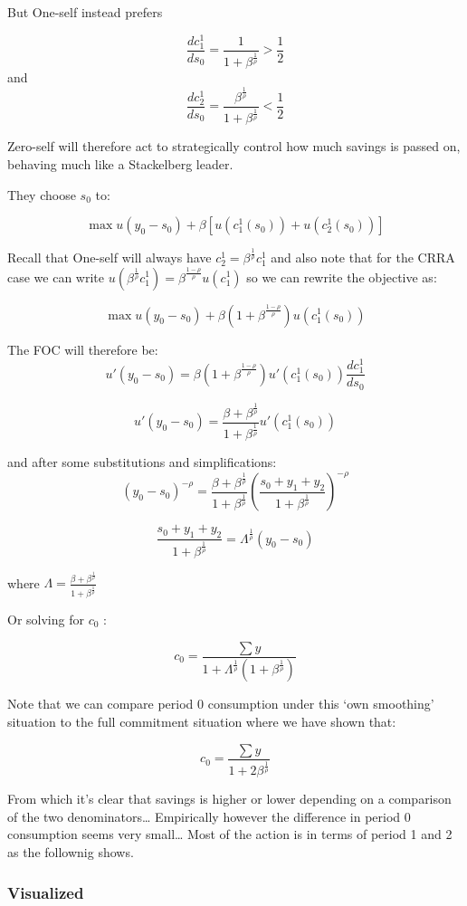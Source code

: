 \documentclass[11pt]{article}
\begin{document}
But One-self instead prefers

\[\frac{dc^1_1}{ds_0} =\frac{1}{1+\beta^\frac{1}{\rho}} > \frac{1}{2}\]
and
\[\frac{dc^1_2}{ds_0} =\frac{\beta^\frac{1}{\rho}}{1+\beta^\frac{1}{\rho}}<\frac{1}{2}\]

Zero-self will therefore act to strategically control how much savings
is passed on, behaving much like a Stackelberg leader.

    They choose \(s_0\) to:

\[\max u(y_0-s_{0})+\beta \left[ u(c^1_1(s_0))+u(c^1_2(s_0))\right] \]

    Recall that One-self will always have
\(c_2^1 =\beta^\frac{1}{\rho} c_1^1\) and also note that for the CRRA
case we can write
\(u(\beta^\frac{1}{\rho}c_1^1)=\beta^\frac{1-\rho}{\rho}u(c_1^1)\) so we
can rewrite the objective as:

\[\max u(y_0-s_{0})+\beta (1+\beta^\frac{1-\rho}{\rho}) u(c^1_1(s_0))\]

    The FOC will therefore be:
\[u'(y_0-s_0) = \beta (1+\beta^\frac{1-\rho}{\rho}) u'(c_1^1(s_0)) \frac{dc_1^1}{ds_0}\]

    \[u'(y_0-s_0) = \frac{\beta +\beta^\frac{1}{\rho}}{1+\beta^\frac{1}{\rho}} u'(c_1^1(s_0)) \]

    and after some substitutions and simplifications: \[(y_0-s_0)^{-\rho}
= \frac{ \beta+\beta^\frac{1}{\rho}}{1+\beta^\frac{1}{\rho}}
(\frac{s_0+y_1 +y_2}{1 + \beta ^\frac{1}{\rho} })^{-\rho} \]

    \[   \frac{s_0+y_1 +y_2}{1 + \beta ^\frac{1}{\rho} }
= \Lambda^\frac{1}{\rho}
(y_0-s_0) \]

where
\(\Lambda = \frac{\beta +\beta^\frac{1}{\rho}}{1+\beta^\frac{1}{\rho}}\)

    Or solving for \(c_0\) :

\[c_0 = \frac{\sum y}{1+\Lambda^\frac{1}{\rho}(1+\beta^\frac{1}{\rho})} \]

    Note that we can compare period 0 consumption under this `own smoothing'
situation to the full commitment situation where we have shown that:

\[c_0 = \frac{\sum y}{1+2\beta^\frac{1}{\rho}} \]

From which it's clear that savings is higher or lower depending on a
comparison of the two denominators\ldots{} Empirically however the
difference in period 0 consumption seems very small\ldots{} Most of the
action is in terms of period 1 and 2 as the follownig shows.

    \hypertarget{visualized}{%
\subsubsection{Visualized}\label{visualized}}
\end{document}
